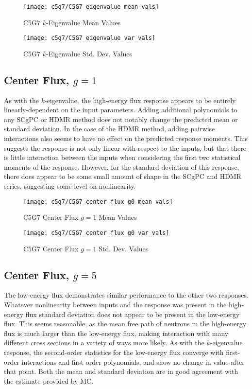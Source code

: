 \begin{figure}[H]
  \centering
  \texttt{[image: c5g7/C5G7\_eigenvalue\_mean\_vals]}
  \caption{C5G7 $k$-Eigenvalue Mean Values}
  \label{fig:c5g7 eigenvalue means}
\end{figure}
\begin{figure}[H]
  \centering
  \texttt{[image: c5g7/C5G7\_eigenvalue\_var\_vals]}
  \caption{C5G7 $k$-Eigenvalue Std. Dev. Values}
  \label{fig:c5g7 eigenvalue vars}
\end{figure}

\subsection{Center Flux, $g=1$}
As with the $k$-eigenvalue, the high-energy flux response appears to be entirely linearly-dependent on the
input parameters.  Adding additional polynomials to any SCgPC or HDMR method does not notably change the
predicted mean or standard deviation.  In the case of the HDMR method, adding pairwise interactions also seems
to have no effect on the predicted response moments.  This suggests the response is not only linear with
respect to the inputs, but that there is little interaction between the inputs when considering the first two
statistical moments of the response.  However, for the standard deviation of this response, there does appear
to be some small amount of shape in the SCgPC and HDMR series, suggesting some level on nonlinearity.

\begin{figure}[H]
  \centering
  \texttt{[image: c5g7/C5G7\_center\_flux\_g0\_mean\_vals]}
  \caption{C5G7 Center Flux $g=1$ Mean Values}
  \label{fig:c5g7 center_flux_g0 means}
\end{figure}
\begin{figure}[H]
  \centering
  \texttt{[image: c5g7/C5G7\_center\_flux\_g0\_var\_vals]}
  \caption{C5G7 Center Flux $g=1$ Std. Dev. Values}
  \label{fig:c5g7 center_flux_g0 vars}
\end{figure}

\subsection{Center Flux, $g=5$}
The low-energy flux demonstrates similar performance to the other two responses.  Whatever nonlinearity
between inputs and the response was present in the high-energy flux standard deviation does not appear to be
present in the low-energy flux.  This seems reasonable, as the mean free path of neutrons in the high-energy
flux is much larger than the low-energy flux, making interaction with many different cross sections in a
variety of ways more likely.  As with the $k$-eigenvalue response, the second-order statistics for the
low-energy flux converge with first-order interactions and first-order polynomials, and show no change
in value after that point.  Both the mean and standard deviation are in good agreement with the estimate
provided by MC.

